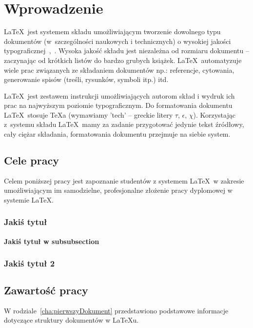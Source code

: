 \chapter{Wprowadzenie}
\label{cha:wprowadzenie}

\LaTeX~jest systemem składu umożliwiającym tworzenie dowolnego typu dokumentów (w~szczególności naukowych i technicznych) o wysokiej jakości typograficznej~\cite{Dil00},~\cite{Lam92}. Wysoka jakość składu jest niezależna od rozmiaru dokumentu -- zaczynając od krótkich listów do bardzo grubych książek. \LaTeX~automatyzuje wiele prac związanych ze składaniem dokumentów np.: referencje, cytowania, generowanie spisów (treśli, rysunków, symboli itp.) itd.

\LaTeX~jest zestawem instrukcji umożliwiających autorom skład i wydruk ich prac na najwyższym poziomie typograficznym. Do formatowania dokumentu \LaTeX~stosuje \TeX a (wymawiamy 'tech' -- greckie litery $\tau$, $\epsilon$, $\chi$). Korzystając z~systemu składu \LaTeX~mamy za zadanie przygotować jedynie tekst źródłowy, cały ciężar składania, formatowania dokumentu przejmuje na siebie system.





\section{Cele pracy}
\label{sec:celePracy}

Celem poniższej pracy jest zapoznanie studentów z systemem \LaTeX~w zakresie umożliwiającym im samodzielne, profesjonalne złożenie pracy dyplomowej w systemie \LaTeX.





\subsection{Jakiś tytuł}


\subsubsection{Jakiś tytuł w subsubsection}

\subsection{Jakiś tytuł 2}


\section{Zawartość pracy}
\label{sec:zawartoscPracy}

W rodziale~\ref{cha:pierwszyDokument} przedstawiono podstawowe informacje dotyczące struktury dokumentów w \LaTeX u.

